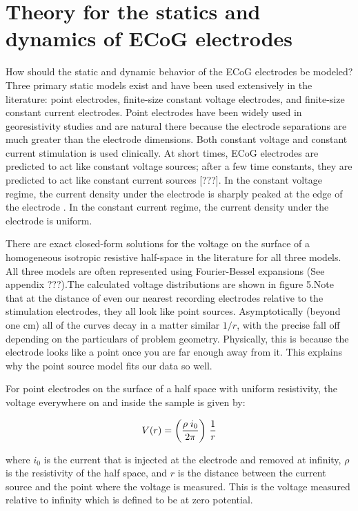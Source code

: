 \section{Theory for the statics and dynamics of ECoG electrodes}

How should the static and dynamic behavior of the ECoG electrodes be modeled?
Three primary static models exist and have been used extensively in the literature: point electrodes, finite-size constant voltage electrodes, and finite-size constant current electrodes.  Point electrodes have been widely used in georesistivity studies and are natural there because the electrode separations are much greater than the electrode dimensions. Both constant voltage and constant current stimulation is used clinically. At short times, ECoG electrodes are predicted to act like constant voltage sources; after a few time constants, they are predicted to act like constant current sources [???]. In the constant voltage regime, the current density under the electrode is sharply peaked at the edge of the electrode \cite{Wiley1982}. In the constant current regime, the current density under the electrode is uniform.

There are exact closed-form solutions for the voltage on the surface of a homogeneous isotropic resistive half-space in the literature for all three models.
All three models are often represented using Fourier-Bessel expansions (See appendix ???).The calculated voltage distributions are shown in figure 5.Note that at the distance of even our nearest recording electrodes relative to the stimulation electrodes, they all look like point sources. Asymptotically (beyond one cm) all of the curves decay in a matter similar $1/r$, with the precise fall off depending on the particulars of problem geometry. Physically, this is because the electrode looks like a point once you are far enough away from it. This explains why the point source model fits our data so well.

For point electrodes on the surface of a half space with uniform resistivity, the voltage everywhere on and inside the sample is given by:

$$V(r) = \bigg( {\rho \; i_0  \over 2 \pi} \bigg) \ {1\over r}$$

\noindent where $i_0$ is the current that is injected at the electrode and removed at infinity, $\rho$ is the resistivity of the half space, and $r$ 
is the distance between the current source and the point where the voltage is measured. This is the voltage measured relative to infinity which is defined to be at zero potential.

